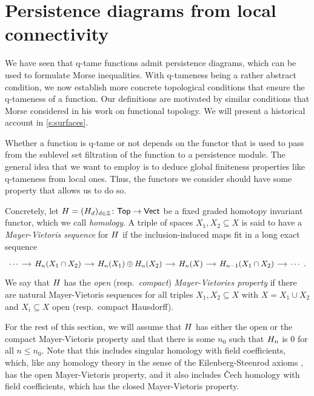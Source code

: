 
\section{Persistence diagrams from local connectivity} \label{s:connectivity}

We have seen that q-tame functions admit persistence diagrams, which can be used to formulate Morse inequalities. With q-tameness being a rather abstract condition, we now establish more concrete topological conditions that ensure the q-tameness of a function. Our definitions are motivated by similar conditions that Morse considered in his work on functional topology. We will present a historical account in \cref{s:surfaces}.

Whether a function is q-tame or not depends on the functor that is used to pass from the sublevel set filtration of the function to a persistence module. The general idea that we want to employ is to deduce global finiteness properties like q-tameness from local ones. Thus, the functors we consider should have some property that allows us to do so.

Concretely, let $H = (H_d)_{d \in \mathbb{Z}} \colon \mathsf{Top} \to \mathsf{Vect}$ be a fixed graded homotopy invariant functor, which we call \emph{homology}.
A triple of spaces $X_{1}, X_{2} \subseteq X$ is said to have a \emph{Mayer-Vietoris sequence} for $H$ if the inclusion-induced maps fit in a long exact sequence
 \[
\begin{tikzcd}[column sep = small]
\cdots \arrow[r] & \H_{n}(X_{1} \cap X_{2}) \arrow[r] & \H_{n}(X_{1}) \oplus \H_{n}(X_{2}) \arrow[r] & \H_{n}(X) \arrow[r] & \H_{n-1}(X_{1} \cap X_{2}) \arrow[r] & \cdots \ .
\end{tikzcd}
\]
We say that $H$ has the \emph{open} (resp.\@\  \emph{compact}) \emph{Mayer-Vietories property} if there are natural Mayer-Vietoris sequences for all triples $X_{1}, X_{2} \subseteq X$ with $X = X_1 \cup X_2$ and $X_i \subseteq X$ open (resp.\@\ compact Hausdorff). 

For the rest of this section, we will assume that $H$ has either the open or the compact Mayer-Vietoris property and that there is some $n_0$ such that $H_{n}$ is 0 for all $n \leq n_0$. 
Note that this includes singular homology with field coefficients, which, like any homology theory in the sense of the Eilenberg-Steenrod axioms \cite[Section I]{MR0050886}, has the open Mayer-Vietoris property, and it also includes \v{C}ech homology with field coefficients, which has the closed Mayer-Vietoris property.

